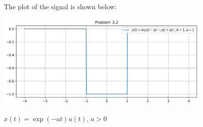 \documentclass[a4paper, 10pt]{article}
\begin{document}
\begin{solution}
The plot of the signal is shown below:
\begin{center}
    \includegraphics[width=0.8\textwidth]{images/problem_3_2.png}
\end{center}
\end{solution}


\begin{subproblems}[start=3]
    \item \( x(t) = \exp(-at)u(t), \,  a > 0 \)
\end{subproblems}
\end{document}
